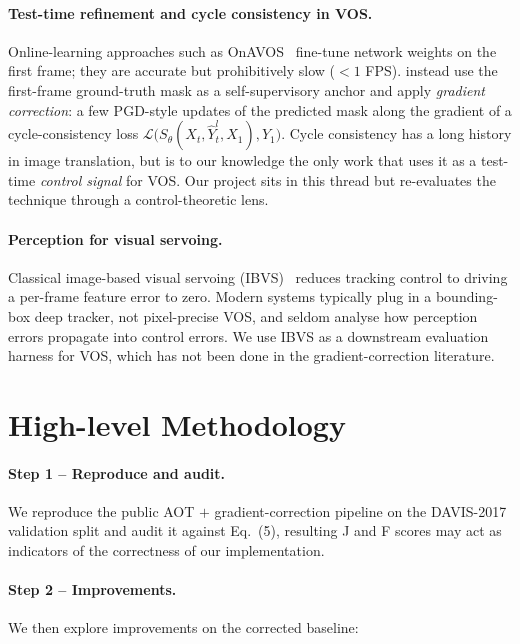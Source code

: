 \documentclass{article}
\begin{document}
\paragraph{Test-time refinement and cycle consistency in VOS.}
Online-learning approaches such as OnAVOS~\citep{voigtlaender2017onavos}
fine-tune network weights on the first frame; they are accurate but
prohibitively slow ($<\!1$ FPS).  \citet{li2020cycle} instead use the
first-frame ground-truth mask as a self-supervisory anchor and apply
\emph{gradient correction}: a few PGD-style updates of the predicted
mask along the gradient of a cycle-consistency loss
$\mathcal{L}\bigl(S_\theta(X_t,\hat Y^{l}_t,X_1),Y_1\bigr)$.  Cycle
consistency has a long history in image translation, but
\citet{li2020cycle} is to our knowledge the only work that uses it as a
test-time \emph{control signal} for VOS.  Our project sits in this
thread but re-evaluates the technique through a control-theoretic lens.

\paragraph{Perception for visual servoing.}
Classical image-based visual servoing (IBVS)~\citep{chaumette2006visual}
reduces tracking control to driving a per-frame feature error to zero.
Modern systems typically plug in a bounding-box deep tracker, not
pixel-precise VOS, and seldom analyse how perception errors propagate
into control errors.  We use IBVS as a downstream evaluation harness
for VOS, which has not been done in the gradient-correction literature.

\section{High-level Methodology}

\paragraph{Step 1 -- Reproduce and audit.}
We reproduce the public AOT $+$ gradient-correction pipeline on the
DAVIS-2017 validation split and audit it against \citet{li2020cycle}
Eq.~(5), resulting J and F scores may act as indicators of the correctness of our implementation.

\paragraph{Step 2 -- Improvements.}
We then explore improvements on the corrected baseline:
\end{document}
